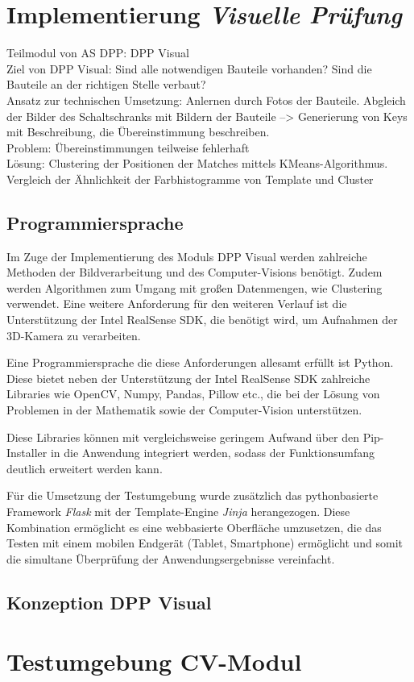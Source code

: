 \documentclass[
    type=Projektarbeit,
    status=draft, %
    language=german, %
    bibengine=bibtex,
]{unibwm-inf-thesis}
\begin{document}
    \chapter{Implementierung \textit{Visuelle Prüfung}}
    Teilmodul von AS DPP: DPP Visual\\
    Ziel von DPP Visual: Sind alle notwendigen Bauteile vorhanden?
    Sind die Bauteile an der richtigen Stelle verbaut?\\
    Ansatz zur technischen Umsetzung: Anlernen durch Fotos der Bauteile.
    Abgleich der Bilder des Schaltschranks mit Bildern der Bauteile --> Generierung von Keys mit Beschreibung, die
    Übereinstimmung beschreiben.\\
    Problem: Übereinstimmungen teilweise fehlerhaft \\
    Lösung: Clustering der Positionen der Matches mittels KMeans-Algorithmus.
    Vergleich der Ähnlichkeit der Farbhistogramme von Template und Cluster


    \section{Programmiersprache}
    Im Zuge der Implementierung des Moduls DPP Visual werden zahlreiche Methoden der Bildverarbeitung und des
    Computer-Visions benötigt.
    Zudem werden Algorithmen zum Umgang mit großen Datenmengen, wie Clustering verwendet.
    Eine weitere Anforderung für den weiteren Verlauf ist die Unterstützung der Intel RealSense SDK, die benötigt wird,
    um Aufnahmen der 3D-Kamera zu verarbeiten.

    Eine Programmiersprache die diese Anforderungen allesamt erfüllt ist Python.
    Diese bietet neben der Unterstützung der Intel RealSense SDK zahlreiche Libraries wie OpenCV, Numpy, Pandas,
    Pillow etc., die bei der Lösung von Problemen in der Mathematik sowie der Computer-Vision unterstützen.

    Diese Libraries können mit vergleichsweise geringem Aufwand über den Pip-Installer in die Anwendung integriert
    werden, sodass der Funktionsumfang deutlich erweitert werden kann.

    Für die Umsetzung der Testumgebung wurde zusätzlich das pythonbasierte Framework \textit{Flask} mit der
    Template-Engine \textit{Jinja} herangezogen.
    Diese Kombination ermöglicht es eine webbasierte Oberfläche umzusetzen, die das Testen mit einem mobilen Endgerät
    (Tablet, Smartphone) ermöglicht und somit die simultane Überprüfung der Anwendungsergebnisse vereinfacht.


    \section{Konzeption DPP Visual}


    \chapter{Testumgebung CV-Modul}



    
    \backmatter
    
    
    
\end{document}

